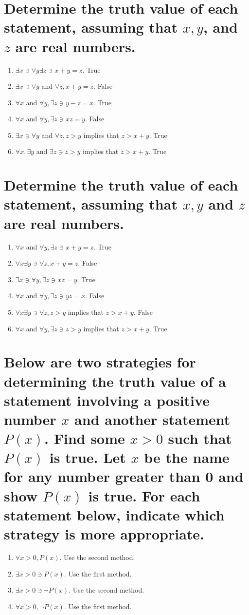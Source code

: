 \documentclass[11pt]{article} %
\begin{document}
\section{Determine the truth value of each statement, assuming that $x,y$, and $z$ are real numbers.}
\begin{enumerate}
\item $\exists x\ni\forall y \exists z\ni x+y=z$.
\subitem True
\item $\exists x \ni\forall y$ and $\forall z, x+y=z$.
\subitem False
\item $\forall x$ and $\forall y,\exists z \ni y-z=x$.
\subitem True
\item $\forall x$ and $\forall y,\exists z \ni xz=y$.
\subitem False
\item $\exists x \ni \forall y$ and $\forall z, z>y$ implies that $z>x+y$.
\subitem True
\item $\forall x, \exists y$ and $\exists z \ni z>y$ implies that $z>x+y$.
\subitem True
\end{enumerate}

\section{Determine the truth value of each statement, assuming that $x,y$ and $z$ are real numbers.}
\begin{enumerate}
\item $\forall x$ and $\forall y, \exists z \ni x+y=z$.
\subitem True
\item $\forall x \exists y \ni \forall z, x+y=z$.
\subitem False
\item $\exists x \ni \forall y, \exists z \ni xz=y$.
\subitem True
\item $\forall x$ and $\forall y, \exists z \ni yz=x$.
\subitem False
\item $\forall x \exists y \ni \forall z, z>y$ implies that $ z>x+y$.
\subitem False
\item $\forall x$ and $\forall y, \exists z \ni z>y$ implies that $z>x+y$.
\subitem True
\end{enumerate}

\section{Below are two strategies for determining the truth value of a statement involving a positive number $x$ and another statement $P(x)$.
Find some $x>0$ such that $P(x)$ is true.
Let $x$ be the name for any number greater than 0 and show $P(x)$ is true.
For each statement below, indicate which strategy is more appropriate.}
\begin{enumerate}
\item $\forall x>0, P(x)$.
\subitem Use the second method.
\item $\exists x>0 \ni P(x)$.
\subitem Use the first method.
\item $\exists x>0 \ni \neg P(x)$.
\subitem Use the second method.
\item $\forall x>0, \neg P(x)$.
\subitem Use the first method.
\end{enumerate}
\end{document}
